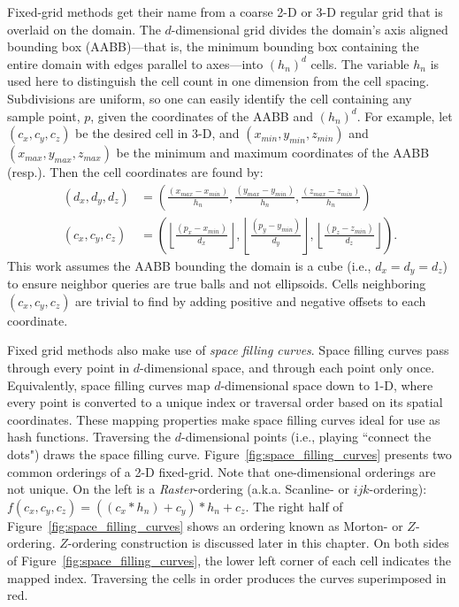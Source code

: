 \documentclass{report}
\begin{document}
Fixed-grid methods get their name from a coarse 2-D or 3-D regular grid that is overlaid on the domain. The $d$-dimensional grid divides the domain's axis aligned bounding box (AABB)---that is, the minimum bounding box containing the entire domain with edges parallel to axes---into $(h_n)^d$ cells. The variable $h_n$ is used here to distinguish the cell count in one dimension from the cell spacing. Subdivisions are uniform, so one can easily identify the cell containing any sample point, $p$, given the coordinates of the AABB and $(h_n)^d$. For example, let $(c_x, c_y, c_z)$ be the desired cell in 3-D, and $(x_{min}, y_{min}, z_{min})$ and $(x_{max}, y_{max}, z_{max})$ be the minimum and maximum coordinates of the AABB (resp.). Then the cell coordinates are found by:  
\begin{align}
(d_x, d_y, d_z) & = \left(\frac{(x_{max} - x_{min})}{h_n}, \frac{(y_{max} - y_{min})}{h_n}, \frac{(z_{max} - z_{min})}{h_n}\right) \nonumber \\
(c_x, c_y, c_z) & = \left(\left\lfloor\frac{(p_x - x_{min})}{d_x}\right\rfloor , \left\lfloor\frac{(p_y - y_{min})}{d_y}\right\rfloor , \left\lfloor\frac{(p_z - z_{min})}{d_z}\right\rfloor \right).
\label{eq:cell_hash}
\end{align}
This work assumes the AABB bounding the domain is a cube (i.e., $d_x = d_y = d_z$) to ensure neighbor queries are true balls and not ellipsoids. 
Cells neighboring $(c_x, c_y, c_z)$ are trivial to find by adding positive and negative offsets to each coordinate. %

Fixed grid methods also make use of \emph{space filling curves}. Space filling curves pass through every point in $d$-dimensional space, and through each point only once. Equivalently, space filling curves map $d$-dimensional space down to 1-D, where every point is converted to a unique index or traversal order based on its spatial coordinates. These mapping properties make space filling curves ideal for use as hash functions. Traversing the $d$-dimensional points (i.e., playing ``connect the dots") draws the space filling curve. Figure~\ref{fig:space_filling_curves} presents two common orderings of a 2-D fixed-grid. Note that one-dimensional orderings are not unique. On the left is a \emph{Raster}-ordering (a.k.a. Scanline- or $ijk$-ordering): $f(c_x,c_y,c_z) = ((c_x * h_n) + c_y) * h_n + c_z$. The right half of Figure~\ref{fig:space_filling_curves} shows an ordering known as Morton- or $Z$-ordering. $Z$-ordering construction is discussed later in this chapter. On both sides of Figure~\ref{fig:space_filling_curves}, the lower left corner of each cell indicates the mapped index. Traversing the cells in order produces the curves superimposed in red. 
\end{document}
